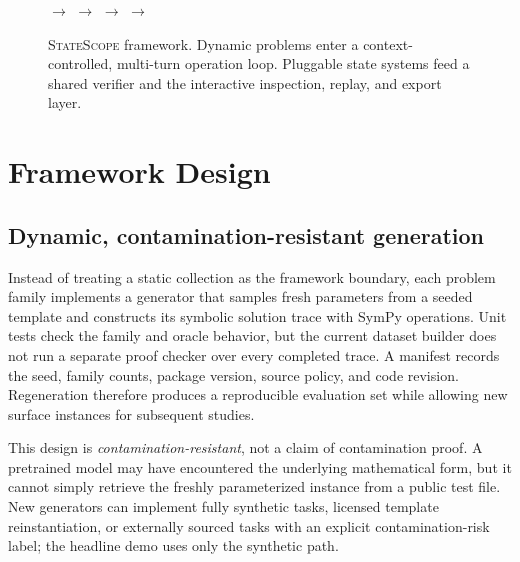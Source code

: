 \documentclass[11pt]{article}
\newcommand{\systemname}{\textsc{StateScope}}
\begin{document}
\begin{figure}[t]
\centering
\setlength{\fboxsep}{5pt}
\small
{}
\hfill$\longrightarrow$\hfill
{}
\hfill$\longrightarrow$\hfill
{}
\hfill$\longrightarrow$\hfill
{}
\hfill$\longrightarrow$\hfill
{}
\caption{\systemname{} framework.  Dynamic problems enter a context-controlled,
multi-turn operation loop.  Pluggable state systems feed a shared verifier and the
interactive inspection, replay, and export layer.}
\label{fig:architecture}
\end{figure}

\section{Framework Design}

\subsection{Dynamic, contamination-resistant generation}

Instead of treating a static collection as the framework boundary, each problem
family implements a generator that samples fresh parameters from a seeded template
and constructs its symbolic solution trace with SymPy operations.  Unit tests check
the family and oracle behavior, but the current dataset builder does not run a
separate proof checker over every completed trace.  A manifest records the
seed, family counts, package version, source policy, and code revision.  Regeneration
therefore produces a reproducible evaluation set while allowing new surface
instances for subsequent studies.

This design is \emph{contamination-resistant}, not a claim of contamination proof.
A pretrained model may have encountered the underlying mathematical form, but it
cannot simply retrieve the freshly parameterized instance from a public test file.
New generators can implement fully synthetic tasks, licensed template
reinstantiation, or externally sourced tasks with an explicit contamination-risk
label; the headline demo uses only the synthetic path.
\end{document}
